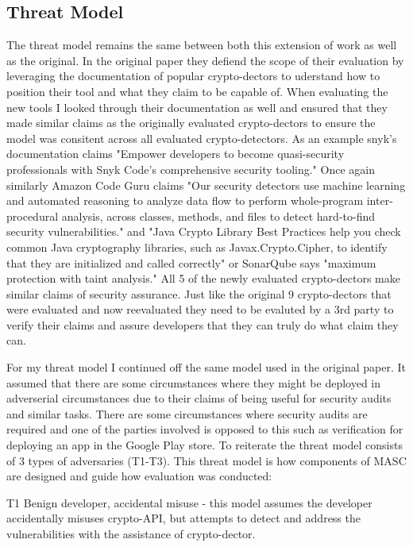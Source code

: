 \subsection{Threat Model}
\label{ch1:subsec:ThreatModel}

The threat model remains the same between both this extension of work as well as the original. In the original paper they defiend the scope of their evaluation by leveraging the documentation of popular crypto-dectors to uderstand how to position their tool and what they claim to be capable of. When evaluating the new tools I looked through their documentation as well and ensured that they made similar claims as the originally evaluated crypto-dectors to ensure the model was consitent across all evaluated crypto-detectors. As an example snyk's documentation claims "Empower developers to become quasi-security professionals with Snyk Code’s comprehensive security tooling." \cite{snyk} Once again similarly Amazon Code Guru claims "Our security detectors use machine learning and automated reasoning to analyze data flow to perform whole-program inter-procedural analysis, across classes, methods, and files to detect hard-to-find security vulnerabilities." \cite{codeguru} and "Java Crypto Library Best Practices help you check common Java cryptography libraries, such as Javax.Crypto.Cipher, to identify that they are initialized and called correctly" or SonarQube says "maximum protection with taint analysis." \cite{sonarqube} All 5 of the newly evaluated crypto-dectors make similar claims of security assurance. Just like the original 9 crypto-dectors that were evaluated and now reevaluated they need to be evaluted by a 3rd party to verify their claims and assure developers that they can truly do what claim they can.

For my threat model I continued off the same model used in the original paper. It assumed that there are some circumstances where they might be deployed in adverserial circumstances due to their claims of being useful for security audits and similar tasks. There are some circumstances where security audits are required and one of the parties involved is opposed to this such as verification for deploying an app in the Google Play store. To reiterate the threat model consists of 3 types of adversaries (T1-T3). This threat model is how components of MASC are designed and guide how evaluation was conducted:

T1 Benign developer, accidental misuse - this model assumes the developer accidentally misuses crypto-API, but attempts to detect and address the vulnerabilities with the assistance of crypto-dector.

